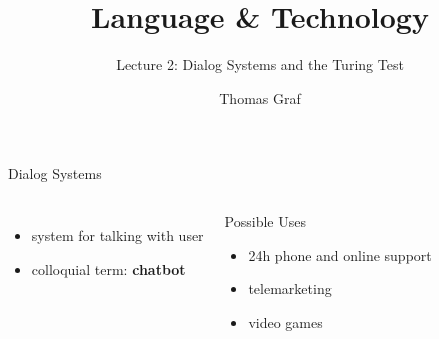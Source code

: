 \documentclass[xcolor={usenames,svgnames,x11names,dvipsnames,table}]{beamer}
\title{\texorpdfstring{Language \& Technology}{Language and Technology}}
\subtitle{Lecture 2: Dialog Systems and the Turing Test}
\author{Thomas Graf}
\institute{Stony Brook University\\\texttt{lin120@thomasgraf.net}}
\date{}
\begin{document}
\unnumbered{
\begin{frame}
	\titlepage
\end{frame}
}

\begin{frame}{Dialog Systems}
    \begin{columns}
        \begin{itemize}
            \item system for talking with user
            \item colloquial term: \textbf{chatbot}
        \end{itemize}

        \begin{block}{Possible Uses}
            \begin{itemize}
                \item 24h phone and online support\\
                \item telemarketing\\
                \item video games\\
            \end{itemize}
        \end{block}


\end{columns}
\end{frame}
\end{document}
